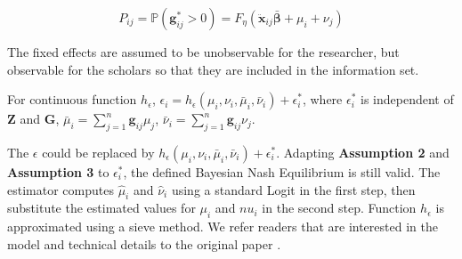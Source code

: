 \begin{equation}
    \nonumber
    P_{ij}= \mathbb{P}(\mathbf{g}_{ij}^*>0) = F_\eta \left( \mathbf{\ddot{x}}_{ij}\mathbf{\bar{\beta}}+\mu_i+\nu_j \right)
\end{equation}

The fixed effects are assumed to be unobservable for the researcher, but observable for the scholars so that they are included in the information set.

\begin{assumption}
    For continuous function $h_\epsilon$, $\epsilon_i=h_\epsilon(\mu_i,\nu_i,\bar{\mu}_i,\bar{\nu}_i)+\epsilon_i^*$, where $\epsilon_i^*$ is independent of $\mathbf{Z}$ and $\mathbf{G}$, $\bar{\mu}_i=\sum_{j=1}^n\mathbf{g}_{ij}\mu_j$, $\bar{\nu}_i=\sum_{j=1}^n\mathbf{g}_{ij}\nu_j$.
\end{assumption}

The $\epsilon$ could be replaced by $h_\epsilon(\mu_i,\nu_i,\bar{\mu}_i,\bar{\nu}_i)+\epsilon_i^*$. Adapting \textbf{Assumption 2} and \textbf{Assumption 3} to $\epsilon_i^*$, the defined Bayesian Nash Equilibrium is still valid. The estimator computes $\hat{\mu}_i$ and $\hat{\nu}_i$ using a standard Logit in the first step, then substitute the estimated values for $\mu_i$ and $nu_i$ in the second step. Function $h_\epsilon$ is approximated using a sieve method. We refer readers that are interested in the model and technical details to the original paper \cite{houndetoungan2022count}.

